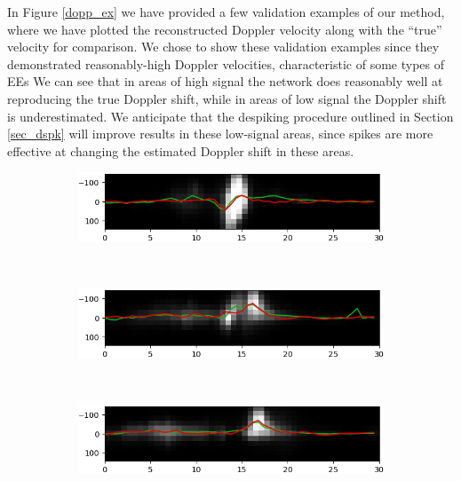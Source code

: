 \documentclass[10pt,letterpaper]{article}
\begin{document}
				In Figure \ref{dopp_ex} we have provided a few validation examples of our method, where we have plotted the reconstructed Doppler velocity along with the ``true'' velocity for comparison. 
				We chose to show these validation examples since they demonstrated reasonably-high Doppler velocities, characteristic of some types of \acp{EE}
				We can see that in areas of high signal the network does reasonably well at reproducing the true Doppler shift, while in areas of low signal the Doppler shift is underestimated.
				We anticipate that the despiking procedure outlined in Section \ref{sec_dspk} will improve results in these low-signal areas, since spikes are more effective at changing the estimated Doppler shift in these areas.
			
				\begin{figure}[h!]
					\centering
					\begin{subfigure}[t]{0.49\textwidth}
						\centering
						\includegraphics[width=\textwidth]{fig/doppler_1182}
					\end{subfigure}
					~ 
					\begin{subfigure}[t]{0.49\textwidth}
						\centering
						\includegraphics[width=\textwidth]{fig/doppler_1225}
					\end{subfigure}
					~ 
					\begin{subfigure}[t]{0.49\textwidth}
						\centering
						\includegraphics[width=\textwidth]{fig/doppler_1263}
					\end{subfigure}
					~ 
					\begin{subfigure}[t]{0.49\textwidth}

\end{subfigure}
\end{figure}
\end{document}
